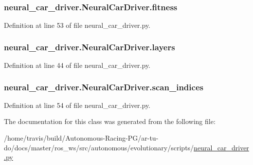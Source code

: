 \subsubsection[{\texorpdfstring{fitness}{fitness}}]{\setlength{\rightskip}{0pt plus 5cm}neural\+\_\+car\+\_\+driver.\+Neural\+Car\+Driver.\+fitness}\hypertarget{classneural__car__driver_1_1_neural_car_driver_a4d709e4419449add88e2a1a5d825e918}{}\label{classneural__car__driver_1_1_neural_car_driver_a4d709e4419449add88e2a1a5d825e918}


Definition at line 53 of file neural\+\_\+car\+\_\+driver.\+py.

\subsubsection[{\texorpdfstring{layers}{layers}}]{\setlength{\rightskip}{0pt plus 5cm}neural\+\_\+car\+\_\+driver.\+Neural\+Car\+Driver.\+layers}\hypertarget{classneural__car__driver_1_1_neural_car_driver_a425f558140c554a734fad61b9eb83940}{}\label{classneural__car__driver_1_1_neural_car_driver_a425f558140c554a734fad61b9eb83940}


Definition at line 44 of file neural\+\_\+car\+\_\+driver.\+py.

\subsubsection[{\texorpdfstring{scan\+\_\+indices}{scan_indices}}]{\setlength{\rightskip}{0pt plus 5cm}neural\+\_\+car\+\_\+driver.\+Neural\+Car\+Driver.\+scan\+\_\+indices}\hypertarget{classneural__car__driver_1_1_neural_car_driver_ac7a4e813a3f642cdb4c88a3c7bcc0ac7}{}\label{classneural__car__driver_1_1_neural_car_driver_ac7a4e813a3f642cdb4c88a3c7bcc0ac7}


Definition at line 54 of file neural\+\_\+car\+\_\+driver.\+py.



The documentation for this class was generated from the following file\+:\begin{DoxyCompactItemize}
\item 
/home/travis/build/\+Autonomous-\/\+Racing-\/\+P\+G/ar-\/tu-\/do/docs/master/ros\+\_\+ws/src/autonomous/evolutionary/scripts/\hyperlink{neural__car__driver_8py}{neural\+\_\+car\+\_\+driver.\+py}\end{DoxyCompactItemize}
